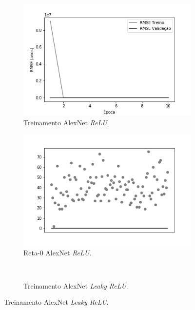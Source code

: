 \begin{figure}[hb!]
	\caption{Resultados do treinamento e teste da CNN AlexNet.}\label{fig:alexnet-abordagem1}
	\begin{subfigure}[hb]{0.5\linewidth}
		\caption{Treinamento AlexNet \emph{ReLU}.}
		\label{fig:redeneuralbiologica}
		\includegraphics[width=\linewidth]{img/graficos-fase2/fig-history-alexnet-relu-data-augmentation-2-1.png}
	\end{subfigure}
  \begin{subfigure}[hb]{0.5\linewidth}
    \caption{Reta-0 AlexNet \emph{ReLU}.}
    \label{fig:reta0reludying}
    \includegraphics[width=\linewidth]{img/graficos-fase2/fig-reta-0-alexnet-relu-data-augmentation-2-1.png}%
  \end{subfigure}\\
	\begin{subfigure}[hb]{0.5\linewidth}
		\caption{Treinamento AlexNet \emph{Leaky ReLU}.}

\end{subfigure}
\end{figure}
